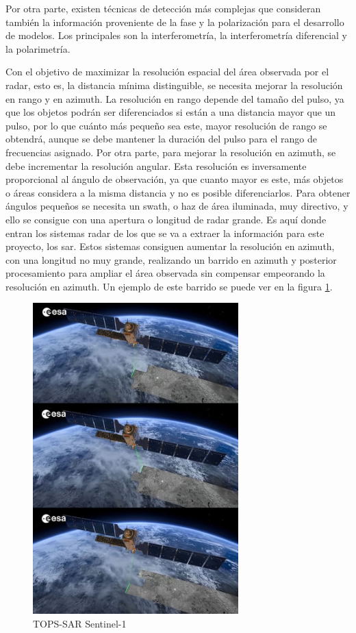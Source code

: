 \par Por otra parte, existen técnicas de detección más complejas que consideran también la información proveniente de la fase y la polarización para el desarrollo de modelos. Los principales son la interferometría, la interferometría diferencial y la polarimetría.
\\
\par Con el objetivo de maximizar la resolución espacial del área observada por el radar, esto es, la distancia mínima distinguible, se necesita mejorar la resolución en rango y en azimuth. La resolución en rango depende del tamaño del pulso, ya que los objetos podrán ser diferenciados si están a una distancia mayor que un pulso, por lo que cuánto más pequeño sea este, mayor resolución de rango se obtendrá, aunque se debe mantener la duración del pulso para el rango de frecuencias asignado. Por otra parte, para mejorar la resolución en azimuth, se debe incrementar la resolución angular. Esta resolución es inversamente proporcional al ángulo de observación, ya que cuanto mayor es este, más objetos o áreas considera a la misma distancia y no es posible diferenciarlos. Para obtener ángulos pequeños se necesita un swath, o haz de área iluminada, muy directivo, y ello se consigue con una apertura o longitud de radar grande. Es aquí donde entran los sistemas radar de los que se va a extraer la información para este proyecto, los \gls{sar}. Estos sistemas consiguen aumentar la resolución en azimuth, con una longitud no muy grande, realizando un barrido en azimuth y posterior procesamiento para ampliar el área observada sin compensar empeorando la resolución en azimuth. Un ejemplo de este barrido se puede ver en la figura \ref{fig:sarb}.
\\
\begin{figure}[h]
    \centering
    \includegraphics[height=12cm]{archivos/tfg/imgbarrido} %
    \caption{TOPS-SAR Sentinel-1 \cite{yts1}}
    \label{fig:sarb}
\end{figure}

